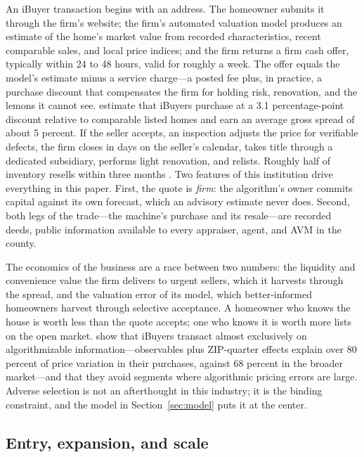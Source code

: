 \documentclass[12pt, letterpaper]{article}
\theoremstyle{remark}
\begin{document}
An iBuyer transaction begins with an address. The homeowner submits it through the firm's website; the firm's automated valuation model produces an estimate of the home's market value from recorded characteristics, recent comparable sales, and local price indices; and the firm returns a firm cash offer, typically within 24 to 48 hours, valid for roughly a week. The offer equals the model's estimate minus a service charge---a posted fee plus, in practice, a purchase discount that compensates the firm for holding risk, renovation, and the lemons it cannot see. \citet{buchak2025intermediating} estimate that iBuyers purchase at a 3.1 percentage-point discount relative to comparable listed homes and earn an average gross spread of about 5 percent. If the seller accepts, an inspection adjusts the price for verifiable defects, the firm closes in days on the seller's calendar, takes title through a dedicated subsidiary, performs light renovation, and relists. Roughly half of inventory resells within three months \citep{buchak2025intermediating}. Two features of this institution drive everything in this paper. First, the quote is \emph{firm}: the algorithm's owner commits capital against its own forecast, which an advisory estimate never does. Second, both legs of the trade---the machine's purchase and its resale---are recorded deeds, public information available to every appraiser, agent, and AVM in the county.

The economics of the business are a race between two numbers: the liquidity and convenience value the firm delivers to urgent sellers, which it harvests through the spread, and the valuation error of its model, which better-informed homeowners harvest through selective acceptance. A homeowner who knows the house is worth less than the quote accepts; one who knows it is worth more lists on the open market. \citet{buchak2025intermediating} show that iBuyers transact almost exclusively on algorithmizable information---observables plus ZIP-quarter effects explain over 80 percent of price variation in their purchases, against 68 percent in the broader market---and that they avoid segments where algorithmic pricing errors are large. Adverse selection is not an afterthought in this industry; it is the binding constraint, and the model in Section~\ref{sec:model} puts it at the center.

\subsection{Entry, expansion, and scale}\label{sec:inst-entry}
\end{document}
